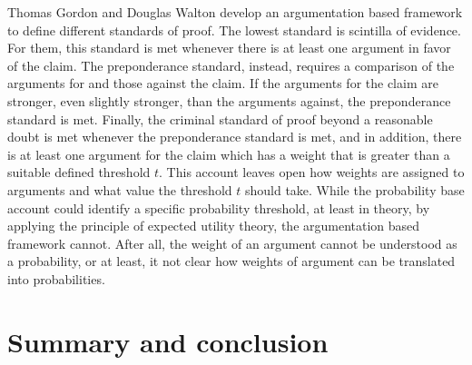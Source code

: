 \documentclass[10pt]{article}
\begin{document}
Thomas Gordon and Douglas Walton develop an argumentation based framework to define different standards of proof. The lowest standard is  scintilla of evidence. For them, this standard is met whenever there is at least one argument in favor of the claim. The preponderance standard, instead, requires a comparison of the arguments for and those against the claim. If the arguments for the claim are stronger, even slightly stronger, than the arguments against, the preponderance standard is met. Finally, the criminal standard of proof beyond a reasonable doubt is met whenever the preponderance standard is met, and in addition, there is at least one argument for the claim which has a weight that is greater than a suitable defined threshold $t$. This account leaves open how weights are assigned to arguments and what value the threshold $t$ should take. While the probability base account could identify a specific probability threshold, at least in theory, by applying the principle of expected utility theory, the argumentation based framework cannot. After all, the weight of an argument cannot be understood as a probability, or at least, it not clear how weights of argument can be translated into probabilities.

 









\section{Summary and conclusion}

%
	

\end{document}
